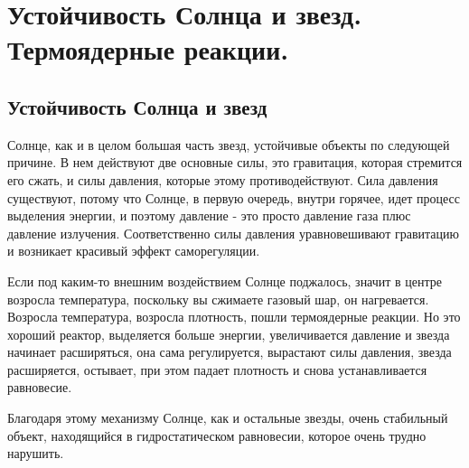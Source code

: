 \section{Устойчивость Солнца и звезд. Термоядерные реакции.}

\subsection{Устойчивость Солнца и звезд}

Солнце, как и в целом большая часть звезд, устойчивые объекты по следующей причине. В нем действуют две основные силы, это гравитация, которая стремится его сжать, и силы давления, которые этому противодействуют. Сила давления существуют, потому что Солнце, в первую очередь, внутри горячее, идет процесс выделения энергии, и поэтому давление - это просто давление газа плюс давление излучения. Соответственно силы давления уравновешивают гравитацию и возникает красивый эффект саморегуляции.

Если под каким-то внешним воздействием Солнце поджалось, значит в центре возросла температура, поскольку вы сжимаете газовый шар, он нагревается. Возросла температура, возросла плотность, пошли термоядерные реакции. Но это хороший реактор, выделяется больше энергии, увеличивается давление и звезда начинает расширяться, она сама регулируется, вырастают силы давления, звезда расширяется, остывает, при этом падает плотность и снова устанавливается равновесие.

Благодаря этому механизму Солнце, как и остальные звезды, очень стабильный объект, находящийся в гидростатическом равновесии, которое очень трудно нарушить.


%
%
%
%
%


